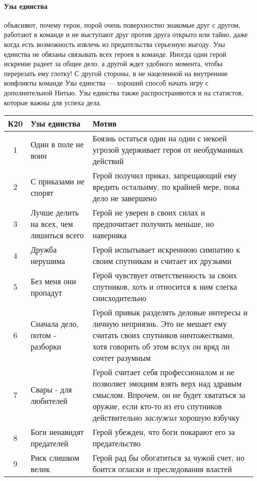 \paragraph{Узы единства} объясняют, почему герои, порой очень поверхностно знакомые друг с другом, работают в команде и не выступают друг против друга открыто или тайно, даже когда есть возможность извлечь из предательства серьезную выгоду. Узы единства не обязаны связывать всех героев в команде. Иногда один герой искренне радеет за общее дело, а другой ждет удобного момента, чтобы перерезать ему глотку! С другой стороны, в не нацеленной на внутренние конфликты команде Узы единства — хороший способ начать игру с дополнительной Нитью. Узы единства также распространяются и на статистов, которые важны для успеха дела.
\begin{center}
\begin{tabular}{ |c|p{4cm}|p{10cm}| }
\hline
\textbf{К20} & \textbf{Узы единства} & \textbf{Мотив} \\ \hline
1 & Один в поле не воин & Боязнь остаться один на один с некоей угрозой удерживает героя от необдуманных действий \\ \hline
2 & С приказами не спорят & Герой получил приказ, запрещающий ему вредить остальнму, по крайней мере, пока дело не завершено \\ \hline
3 & Лучше делить на всех, чем лишиться всего & Герой не уверен в своих силах и предпочитает получить меньше, но наверняка \\ \hline
4 & Дружба нерушима & Герой испытывает искреннюю симпатию к своим спутникам и считает их друзьями \\ \hline
5 & Без меня они пропадут & Герой чувствует ответственность за своих спутников, хоть и относится к ним слегка снисходительно \\ \hline
6 & Сначала дело, потом - разборки & Герой привык разделять деловые интересы и личную неприязнь. Это не мешает ему считать своих спутников ничтожествами, хотя говорить об этом вслух он вряд ли сочтет разумным \\ \hline
7 & Свары - для любителей & Герой считает себя профессионалом и не позволяет эмоциям взять верх над здравым смыслом. Впрочем, он не будет хвататься за оружие, если кто-то из его спутников действительно \textit{заслужил} хорошую взбучку \\ \hline
8 & Боги ненавидят предателей & Герой убежден, что боги покарают его за предательство \\ \hline
9 & Риск слишком велик & Герой рад бы обогатиться за чужой счет, но боится огласки и преследования властей \\ \hline

\end{tabular}
\end{center}
